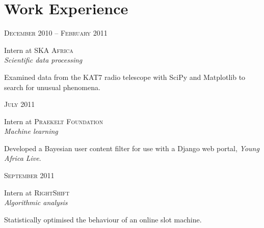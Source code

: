 \documentclass[a4paper,10pt]{article} %
\begin{document}
\begin{minipage}[t]{0.44\textwidth} 
\vspace{0pt} %


\section{Work Experience} 


{\raggedleft\textsc{December 2010 -- February 2011}\par}

{\raggedright\large Intern at \textsc{SKA Africa}\\
\textit{Scientific data processing}\\[5pt]}

\normalsize{Examined data from the KAT7 radio telescope with SciPy and Matplotlib to search for unusual phenomena.}\\


{\raggedleft\textsc{July 2011}\par}

{\raggedright\large Intern at \textsc{Praekelt Foundation}\\
\textit{Machine learning}\\[5pt]}

\normalsize{Developed a Bayesian user content filter for use with a Django web portal, \emph{Young Africa Live}.}\\


{\raggedleft\textsc{September 2011}\par}

{\raggedright\large Intern at \textsc{RightShift}\\
\textit{Algorithmic analysis}\\[5pt]}

\normalsize{Statistically optimised the behaviour of an online slot machine.}\\


\end{minipage}
\end{document}
